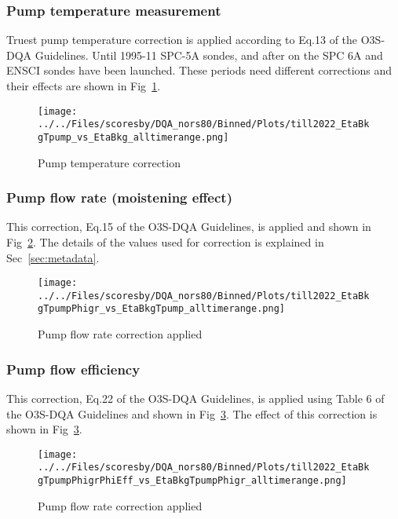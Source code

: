             \subsubsection{Pump temperature measurement}
 Truest pump temperature correction is applied according to Eq.13 of the O3S-DQA Guidelines. Until 1995-11 SPC-5A sondes,
 and after on the SPC 6A and ENSCI sondes have been launched. These periods need different corrections and
 their effects are shown in Fig~\ref{fig:tpump}.

%
                    \begin{figure}
        \centering
\texttt{[image: ../../Files/scoresby/DQA\_nors80/Binned/Plots/till2022\_EtaBkgTpump\_vs\_EtaBkg\_alltimerange.png]}
    \caption{Pump temperature correction }
            \label{fig:tpump}
    \end{figure}
                \subsubsection{Pump flow rate (moistening effect)}
    This correction, Eq.15 of the O3S-DQA Guidelines, is applied and shown in Fig~\ref{fig:pf_ptu}. The details of the
values used for correction is explained in Sec~\ref{sec:metadata}.
%
                        \begin{figure}
        \centering
\texttt{[image: ../../Files/scoresby/DQA\_nors80/Binned/Plots/till2022\_EtaBkgTpumpPhigr\_vs\_EtaBkgTpump\_alltimerange.png]}
    \caption{Pump flow rate correction applied}
            \label{fig:pf_ptu}
    \end{figure}
                   \subsubsection{Pump flow efficiency}
    This correction, Eq.22 of the O3S-DQA Guidelines, is applied using Table 6 of the O3S-DQA Guidelines and
    shown in Fig~\ref{fig:pf_eff}.
The effect of this correction is shown in Fig~\ref{fig:pf_eff}.
%
                        \begin{figure}
        \centering
\texttt{[image: ../../Files/scoresby/DQA\_nors80/Binned/Plots/till2022\_EtaBkgTpumpPhigrPhiEff\_vs\_EtaBkgTpumpPhigr\_alltimerange.png]}
    \caption{Pump flow rate correction applied}
            \label{fig:pf_eff}
    \end{figure}

